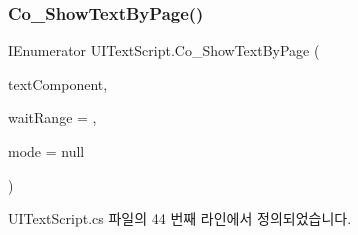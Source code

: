 \subsubsection{\texorpdfstring{Co\_ShowTextByPage()}{Co\_ShowTextByPage()}}
{\footnotesize\ttfamily I\+Enumerator U\+I\+Text\+Script.\+Co\+\_\+\+Show\+Text\+By\+Page (\begin{DoxyParamCaption}\item[{T\+M\+P\+\_\+\+Text}]{text\+Component,  }\item[{float}]{wait\+Range = {},  }\item[{\mbox{\hyperlink{class_u_i_text_script_a0ecb940dec27ce92266d03cd4fd2042a}{Text\+Show\+Mode}}}]{mode = {\ttfamily null} }\end{DoxyParamCaption})\hspace{0.3cm}{\ttfamily [private]}}



U\+I\+Text\+Script.\+cs 파일의 44 번째 라인에서 정의되었습니다.


